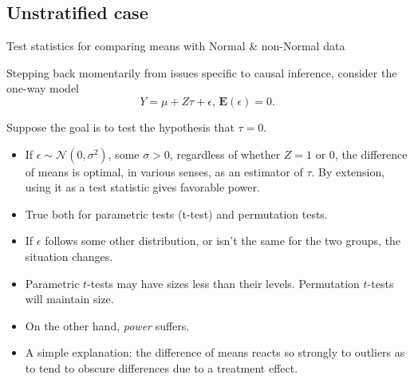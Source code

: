\subsection{Unstratified case}
\begin{frame}{Test statistics for comparing means with Normal \& non-Normal data}

Stepping back momentarily from issues specific to causal inference, consider the one-way model
$$
Y = \mu + Z\tau + \epsilon,\, \mathbf{E}(\epsilon) = 0.
$$

Suppose the goal is to test the hypothesis that $\tau = 0$. 
  
\begin{itemize}[<+->]
\item If $\epsilon \sim \mathcal{N}(0, \sigma^{2})$, some $\sigma >0$, regardless of whether $Z=1$ or 0, the difference of means is optimal, in various senses, as an estimator of $\tau$. By extension, using it as a test statistic gives favorable power.
\item True both for parametric tests (t-test) and permutation tests. 
\item If $\epsilon$ follows some other distribution, or isn't the same for the two groups, the situation changes.
\item Parametric $t$-tests may have sizes less than their levels. Permutation $t$-tests will maintain size.
\item On the other hand, \textit{power} suffers.
\item A simple explanation: the difference of means reacts so strongly to outliers as to tend to obscure differences due to a treatment effect.
\end{itemize}
\end{frame}

